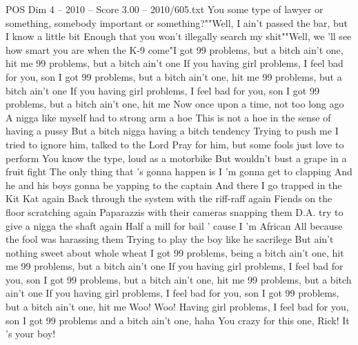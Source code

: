 \begin{textsample}{POS Dim 4 – 2010 – Score 3.00 – 2010/605.txt}
You some type of lawyer or something, somebody important or something?""Well, I ain't passed the bar, but I know a little bit Enough that you won't illegally search my shit""Well, we 'll see how smart you are when the K-9 come"I got 99 problems, but a bitch ain't one, hit me 99 problems, but a bitch ain't one If you having girl problems, I feel bad for you, son I got 99 problems, but a bitch ain't one, hit me 99 problems, but a bitch ain't one If you having girl problems, I feel bad for you, son I got 99 problems, but a bitch ain't one, hit me Now once upon a time, not too long ago A nigga like myself had to strong arm a hoe This is not a hoe in the sense of having a pussy But a bitch nigga having a bitch tendency Trying to push me I tried to ignore him, talked to the Lord Pray for him, but some fools just love to perform You know the type, loud as a motorbike But wouldn't bust a grape in a fruit fight The only thing that 's gonna happen is I 'm gonna get to clapping And he and his boys gonna be yapping to the captain And there I go trapped in the Kit Kat again Back through the system with the riff-raff again Fiends on the floor scratching again Paparazzis with their cameras snapping them D.A. try to give a nigga the shaft again Half a mill for bail ' cause I 'm African All because the fool was harassing them Trying to play the boy like he sacrilege But ain't nothing sweet about whole wheat I got 99 problems, being a bitch ain't one, hit me 99 problems, but a bitch ain't one If you having girl problems, I feel bad for you, son I got 99 problems, but a bitch ain't one, hit me 99 problems, but a bitch ain't one If you having girl problems, I feel bad for you, son I got 99 problems, but a bitch ain't one, hit me Woo!
Woo!
Having girl problems, I feel bad for you, son I got 99 problems and a bitch ain't one, haha You crazy for this one, Rick!
It 's your boy!

\end{textsample}
